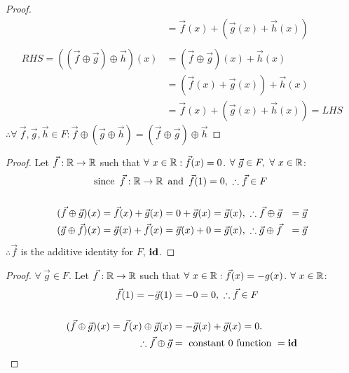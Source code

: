 \documentclass{article}
\begin{document}
\begin{enumerate}
\begin{proof}
\begin{align*}
                                                               & = \vec{f}(x) + (\vec{g}(x) + \vec{h}(x))       \\ \\
            RHS = ((\vec{f} \oplus \vec{g}) \oplus \vec{h})(x) & = (\vec{f} \oplus \vec{g})(x) + \vec{h}(x)     \\
                                                               & = (\vec{f}(x) + \vec{g}(x)) + \vec{h}(x)       \\
                                                               & = \vec{f}(x) + (\vec{g}(x) + \vec{h}(x)) = LHS
        \end{align*}
        $\therefore \forall~\vec{f},\vec{g},\vec{h} \in F: \vec{f} \oplus (\vec{g} \oplus \vec{h}) = (\vec{f} \oplus \vec{g}) \oplus \vec{h}$
    \end{proof}
    \begin{proof}
        Let $\vec{f}: \mathbb{R} \rightarrow \mathbb{R}$ such that $\forall~x \in \mathbb{R}: \vec{f}(x) = 0$. $\forall~\vec{g} \in F,~\forall~x \in \mathbb{R}$:
        \begin{align*}
            \operatorname{~\text{since}~} \vec{f}: \mathbb{R} \rightarrow \mathbb{R}            & \operatorname{~\text{and}~} \vec{f}(1) = 0,~\therefore \vec{f} \in F                              \\ \\
            (\vec{f} \oplus \vec{g})(x) = \vec{f}(x) + \vec{g}(x) & = 0 + \vec{g}(x)= \vec{g}(x),~\therefore \vec{f} \oplus \vec{g} & = \vec{g} \\
            (\vec{g} \oplus \vec{f})(x) = \vec{g}(x) + \vec{f}(x) & = \vec{g}(x) + 0= \vec{g}(x),~\therefore \vec{g} \oplus \vec{f} & = \vec{g}
        \end{align*}
        $\therefore \vec{f}$ is the additive identity for $F$, $\operatorname{\textbf{id}}$.
    \end{proof}
    \begin{proof}
        $\forall~\vec{g} \in F$. Let $\vec{f}: \mathbb{R} \rightarrow \mathbb{R}$ such that $\forall~x \in \mathbb{R}: \vec{f}(x) = -g(x)$. $\forall~x \in \mathbb{R}$:
        \begin{align*}
            \vec{f}(1) = -\vec{g}(1)                                   & = -0 = 0,~\therefore \vec{f} \in F   \\ \\
            (\vec{f} \oplus \vec{g})(x) = \vec{f}(x) \oplus \vec{g}(x) & = -\vec{g}(x) + \vec{g}(x)= 0.       \\
            \therefore \vec{f} \oplus \vec{g}                          & = ~\text{constant 0 function}~ = \id \\

\end{align*}
\end{proof}
\end{enumerate}
\end{document}
